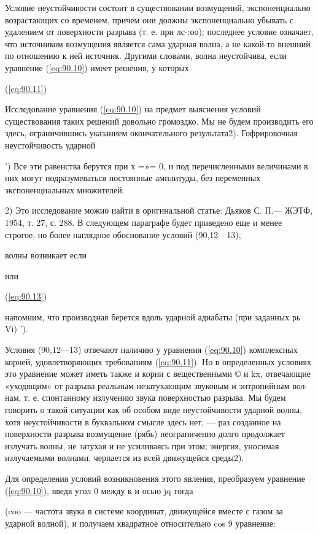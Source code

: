 Условие неустойчивости состоит в существовании возмущений, экспоненциально
возрастающих со временем, причем они должны экспоненциально убывать с удалением
от поверхности разрыва (т. е. при лс-:оо); последнее условие означает, что
источником возмущения является сама ударная волна, а не какой-то внешний по
отношению к ней источник. Другими словами, волна неустойчива, если уравнение
(\ref{eq:90.10}) имеет решения, у которых

(\ref{eq:90.11})

Исследование уравнения (\ref{eq:90.10}) на предмет выяснения условий
существования таких решений довольно громоздко. Мы не будем производить его
здесь, ограничившись указанием окончательного результата2). Гофрировочная
неустойчивость ударной

') Все эти равенства берутся при х =»= 0, и под перечисленными величинами в них
могут подразумеваться постоянные амплитуды, без переменных экспоненциальных
множителей.

2) Это исследование можио иайти в оригинальной статье: Дьяков С. П.— ЖЭТФ,
1954, т. 27, с. 288. В следующем параграфе будет приведено еще и менее строгое,
но более наглядное обоснование условий (90,12—13),


волны возникает если


или

(\ref{eq:90.13})

напомним, что производная берется вдоль ударной адиабаты (при заданных рь Vi)
').

Условия (90,12—13) отвечают наличию у уравнения (\ref{eq:90.10}) комплексных
корней, удовлетворяющих требованиям (\ref{eq:90.11}). Но в определенных
условиях это уравнение может иметь также и корни с вещественными © и kx,
отвечающие «уходящим» от разрыва реальным незатухающим звуковым и энтропийным
вол-нам, т. е. спонтанному излучению звука поверхностью разрыва. Мы будем
говорить о такой ситуации как об особом виде неустойчивости ударной волны, хотя
неустойчивости в буквальном смысле здесь нет, — раз созданное на поверхности
разрыва возмущение (рябь) неограниченно долго продолжает излучать волны, не
затухая и не усиливаясь при этом; энергия, уносимая излучаемыми волнами,
черпается из всей движущейся среды2).

Для определения условий возникновения этого явления, преобразуем уравнение
(\ref{eq:90.10}), введя угол 0 между к и осью jq тогда


(coo — частота звука в системе координат, движущейся вместе с газом за ударной
волной), и получаем квадратное относительно cos 9 уравнение:


